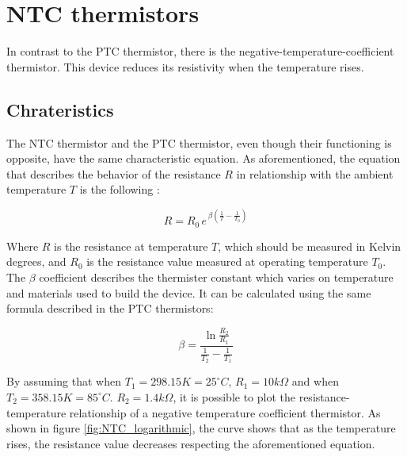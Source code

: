 \vspace{30px}\section{NTC thermistors}
In contrast to the PTC thermistor, there is the negative-temperature-coefficient thermistor. This device reduces its resistivity when the temperature rises.






\subsection{Chrateristics}
The NTC thermistor and the PTC thermistor, even though their functioning is opposite, have the same characteristic equation. As aforementioned, the equation that describes the behavior of the resistance $R$ in relationship with the ambient temperature $T$ is the following \cite{Chen20091103}:

\begin{equation*}
    R = R_0 \, e^{\, \beta\left( \frac{1}{T} - \frac{1}{T_0}\right)}
\end{equation*}

\noindent Where $R$ is the resistance at temperature $T$, which should be measured in Kelvin degrees, and $R_0$ is the resistance value measured at operating temperature $T_0$. The $\beta$ coefficient describes the thermister constant which varies on temperature and materials used to build the device. It can be calculated using the same formula described in the PTC thermistors:

\begin{equation*}
    \beta = \frac{\ln{\frac{R_2}{R_1}}}{\frac{1}{T_2} - \frac{1}{T_1}}
\end{equation*}

\noindent By assuming that when $T_1 = 298.15 K = 25^\circ C$, $R_1 = 10k\Omega$ and when $T_2 = 358.15 K = 85^\circ C$. $R_2 = 1.4k\Omega$, it is possible to plot the resistance-temperature relationship of a negative temperature coefficient thermistor. As shown in figure \ref{fig:NTC_logarithmic}, the curve shows that as the temperature rises, the resistance value decreases respecting the aforementioned equation.

